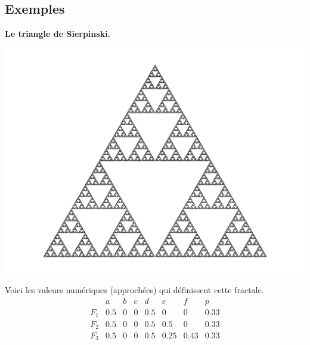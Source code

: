 \documentclass[11pt,class=report,crop=false]{standalone}
\begin{document}



\subsection{Exemples}


\textbf{Le triangle de Sierpinski.}

\begin{center}
\includegraphics[scale=\myscale,scale=0.4]{figures/ifs-02}
\end{center}

Voici les valeurs numériques (approchées) qui définissent cette fractale.
\begin{displaymath}
\begin{array}{c|ccccccc}
     & a & b & c & d & e & f & p\\
\hline
F_1 & 0.5 & 0 & 0 & 0.5 & 0 & 0 & 0.33\\
\hline
F_2 & 0.5 & 0 & 0 & 0.5 & 0.5 & 0 & 0.33 \\
\hline
F_3 & 0.5 & 0 & 0 & 0.5 & 0.25 & 0.43 & 0.33 \\
\end{array}
\end{displaymath}
\end{document}
